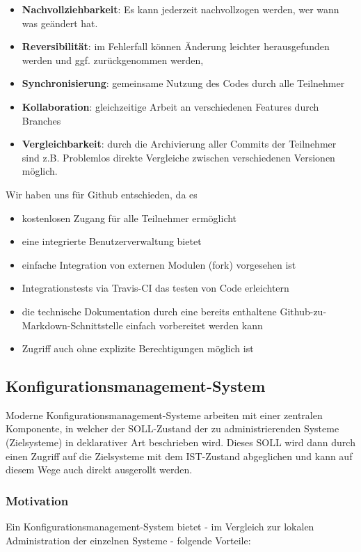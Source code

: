 \begin{itemize}
\item \textbf{Nachvollziehbarkeit}: Es kann jederzeit nachvollzogen werden, wer wann was geändert hat.
\item \textbf{Reversibilität}: im Fehlerfall können Änderung leichter herausgefunden werden und ggf. zurückgenommen werden,
\item \textbf{Synchronisierung}: gemeinsame Nutzung des Codes durch alle Teilnehmer
\item \textbf{Kollaboration}: gleichzeitige Arbeit an verschiedenen Features durch Branches
\item \textbf{Vergleichbarkeit}: durch die Archivierung aller Commits der Teilnehmer sind z.B. Problemlos direkte Vergleiche zwischen verschiedenen Versionen möglich.
\end{itemize}

Wir haben uns für Github entschieden, da es
\begin{itemize}
\item kostenlosen Zugang für alle Teilnehmer ermöglicht
\item eine integrierte Benutzerverwaltung bietet
\item einfache Integration von externen Modulen (fork) vorgesehen ist
\item Integrationstests via Travis-CI das testen von Code erleichtern
\item die technische Dokumentation durch eine bereits enthaltene Github-zu-Markdown-Schnittstelle einfach vorbereitet werden kann
\item Zugriff auch ohne explizite Berechtigungen möglich ist
\end{itemize}

\subsection{Konfigurationsmanagement-System}
Moderne Konfigurationsmanagement-Systeme arbeiten mit einer zentralen Komponente, in welcher der SOLL-Zustand der zu administrierenden Systeme (Zielsysteme) in deklarativer Art beschrieben wird. Dieses SOLL wird dann durch einen Zugriff auf die Zielsysteme mit dem IST-Zustand abgeglichen und kann auf diesem Wege auch direkt ausgerollt werden.

\subsubsection{Motivation}
Ein Konfigurationsmanagement-System bietet - im Vergleich zur lokalen Administration der einzelnen Systeme - folgende Vorteile:

